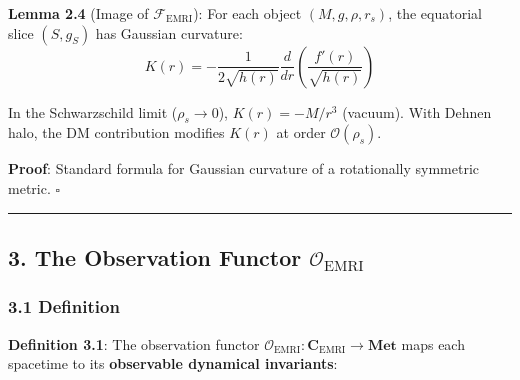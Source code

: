\documentclass[
]{article}
\begin{document}
\textbf{Lemma 2.4} (Image of \(\mathcal{F}_{\text{EMRI}}\)): For each
object \((M, g, \rho, r_s)\), the equatorial slice \((S, g_S)\) has
Gaussian curvature:
\[K(r) = -\frac{1}{2\sqrt{h(r)}} \frac{d}{dr}\left(\frac{f'(r)}{\sqrt{h(r)}}\right)\]

In the Schwarzschild limit (\(\rho_s \to 0\)), \(K(r) = -M/r^3\)
(vacuum). With Dehnen halo, the DM contribution modifies \(K(r)\) at
order \(\mathcal{O}(\rho_s)\).

\textbf{Proof}: Standard formula for Gaussian curvature of a
rotationally symmetric metric. \(\square\)

\begin{center}\rule{0.5\linewidth}{0.5pt}\end{center}

\subsection{\texorpdfstring{3. The Observation Functor
\(\mathcal{O}_{\text{EMRI}}\)}{3. The Observation Functor \textbackslash mathcal\{O\}\_\{\textbackslash text\{EMRI\}\}}}\label{the-observation-functor-mathcalo_textemri}

\subsubsection{3.1 Definition}\label{definition-1}

\textbf{Definition 3.1}: The observation functor
\(\mathcal{O}_{\text{EMRI}}: \mathbf{C}_{\text{EMRI}} \to \mathbf{Met}\)
maps each spacetime to its \textbf{observable dynamical invariants}:
\end{document}
